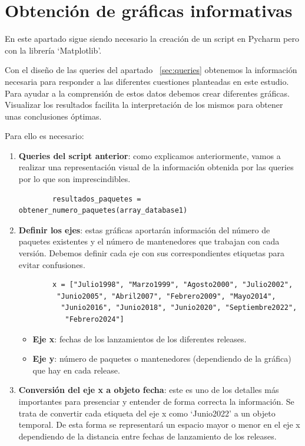 \documentclass[a4paper, 12pt]{book}
\begin{document}
\section{Obtención de gráficas informativas}
\label{sec:graficas}

En este apartado sigue siendo necesario la creación de un script en Pycharm pero con la librería `Matplotlib'.

Con el diseño de las queries del apartado ~\ref{sec:queries} obtenemos la información necesaria para responder a las diferentes cuestiones planteadas en este estudio.
Para ayudar a la comprensión de estos datos debemos crear diferentes gráficas.
Visualizar los resultados facilita la interpretación de los mismos para obtener unas conclusiones óptimas.

Para ello es necesario:
\begin{enumerate}
	\item \textbf{Queries del script anterior}: como explicamos anteriormente, vamos a realizar una representación visual de la información obtenida por las queries por lo que son imprescindibles.
	
	\begin{verbatim}
		resultados_paquetes = obtener_numero_paquetes(array_database1)
	\end{verbatim} 
	
	\item \textbf{Definir los ejes}: estas gráficas aportarán información del número de paquetes existentes y el número de mantenedores que trabajan con cada versión. Debemos definir cada eje con sus correspondientes etiquetas para evitar confusiones.
	
	\begin{verbatim}
		x = ["Julio1998", "Marzo1999", "Agosto2000", "Julio2002",
		 "Junio2005", "Abril2007", "Febrero2009", "Mayo2014",
		  "Junio2016", "Junio2018", "Junio2020", "Septiembre2022",
		   "Febrero2024"]
	\end{verbatim} 
	
	\begin{itemize}
		\item \textbf{Eje x}: fechas de los lanzamientos de los diferentes releases.
		
		\item \textbf{Eje y}: número de paquetes o mantenedores (dependiendo de la gráfica) que hay en cada release.
	\end{itemize}
	
	\item \textbf{Conversión del eje x a objeto fecha}: este es uno de los detalles más importantes para presenciar y entender de forma correcta la información. Se trata de convertir cada etiqueta del eje x como `Junio2022' a un objeto temporal. De esta forma se representará un espacio mayor o menor en el eje x dependiendo de la distancia entre fechas de lanzamiento de los releases.
	

\end{enumerate}
\end{document}
